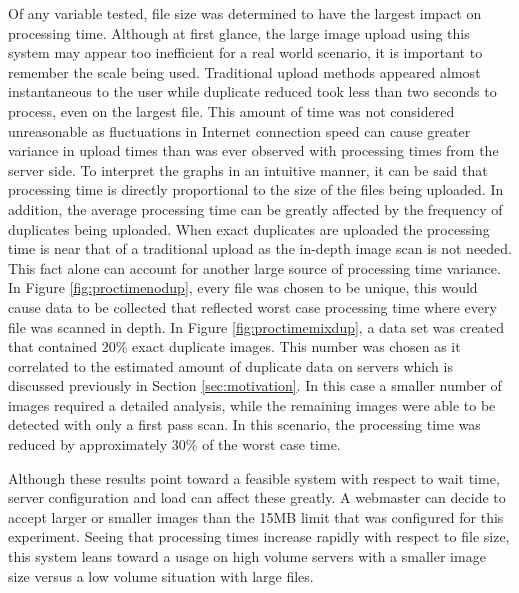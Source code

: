 Of any variable tested, file size was determined to have the largest impact on processing time. Although at first glance, the large image upload using this system may appear too inefficient for a real world scenario, it is important to remember the scale being used. Traditional upload methods appeared almost instantaneous to the user while duplicate reduced took less than two seconds to process, even on the largest file. This amount of time was not considered unreasonable as fluctuations in Internet connection speed can cause greater variance in upload times than was ever observed with processing times from the server side. To interpret the graphs in an intuitive manner, it can be said that processing time is directly proportional to the size of the files being uploaded. In addition, the average processing time can be greatly affected by the frequency of duplicates being uploaded. When exact duplicates are uploaded the processing time is near that of a traditional upload as the in-depth image scan is not needed. This fact alone can account for another large source of processing time variance. In Figure \ref{fig:proctimenodup}, every file was chosen to be unique, this would cause data to be collected that reflected worst case processing time where every file was scanned in depth. In Figure \ref{fig:proctimemixdup}, a data set was created that contained 20\% exact duplicate images. This number was chosen as it correlated to the estimated amount of duplicate data on servers which is discussed previously in Section \ref{sec:motivation}. In this case a smaller number of images required a detailed analysis, while the remaining images were able to be detected with only a first pass scan. In this scenario, the processing time was reduced by approximately 30\% of the worst case time.

Although these results point toward a feasible system with respect to wait time, server configuration and load can affect these greatly. A webmaster can decide to accept larger or smaller images than the 15MB limit that was configured for this experiment. Seeing that processing times increase rapidly with respect to file size, this system leans toward a usage on high volume servers with a smaller image size versus a low volume situation with large files.

